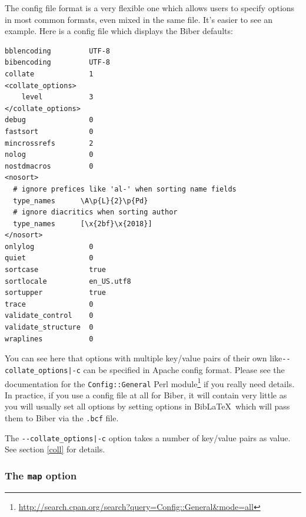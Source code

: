 \documentclass{ltxdockit}
\begin{document}
\noindent The config file format is a very flexible one which allows users to specify
options in most common formats, even mixed in the same file. It's easier to
see an example. Here is a config file which displays the Biber
defaults:

\begin{verbatim}
bblencoding         UTF-8
bibencoding         UTF-8
collate             1
<collate_options>
    level           3
</collate_options>
debug               0
fastsort            0
mincrossrefs        2
nolog               0
nostdmacros         0
<nosort>
  # ignore prefices like 'al-' when sorting name fields
  type_names      \A\p{L}{2}\p{Pd}
  # ignore diacritics when sorting author
  type_names      [\x{2bf}\x{2018}]
</nosort>
onlylog             0
quiet               0
sortcase            true
sortlocale          en_US.utf8
sortupper           true
trace               0
validate_control    0
validate_structure  0
wraplines           0
\end{verbatim}

\noindent You can see here that options with multiple key/value pairs of
their own like\linebreak[4]\verb+--collate_options|-c+ can be specified in
Apache config format. Please see the documentation
for the \verb+Config::General+ Perl
module\footnote{\url{http://search.cpan.org/search?query=Config::General&mode=all}}
if you really need details. In practice, if you use a config file at all
for Biber, it will contain very little as you will usually set all
options by setting options in Bib\LaTeX\ which will pass them to
Biber via the \verb+.bcf+ file.

The \verb+--collate_options|-c+ option takes a number of key/value pairs as
value. See section \ref{coll} for details.

\subsubsection{The \texttt{map} option}\label{map}
\end{document}
